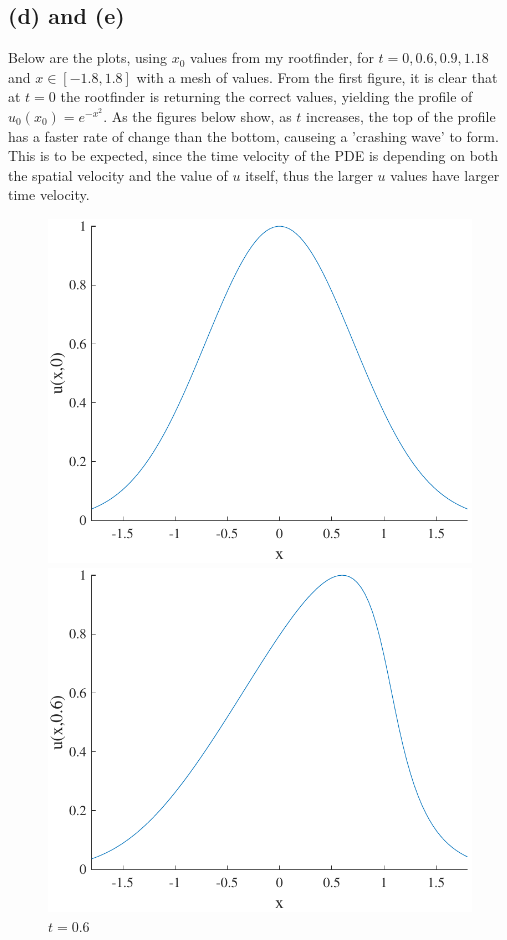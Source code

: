 \documentclass{article}
\begin{document}
\subsection*{(d) and (e)}
Below are the plots, using $x_0$ values from my rootfinder, for $t = 0, 0.6, 0.9, 1.18$ and $x \in [-1.8, 1.8]$ with a mesh of values. From the first figure, it is clear that at $t=0$ the rootfinder is returning the correct values, yielding the profile of $u_0(x_0) = e^{-x^2}$. As the figures below show, as $t$ increases, the top of the profile has a faster rate of change than the bottom, causeing a 'crashing wave' to form. This is to be expected, since the time velocity of the PDE is depending on both the spatial velocity and the value of $u$ itself, thus the larger $u$ values have larger time velocity.
\begin{figure}[H]
  \centering
  \begin{minipage}[b]{0.49\textwidth}
    \includegraphics[width=\textwidth]{hw_13_plot2.pdf}
    \caption{$t = 0$}

  \end{minipage}
  \hfill
  \begin{minipage}[b]{0.49\textwidth}
    \includegraphics[width=\textwidth]{hw_13_plot3.pdf}
    \caption{$t = 0.6$}


\end{minipage}
\end{figure}
\end{document}
